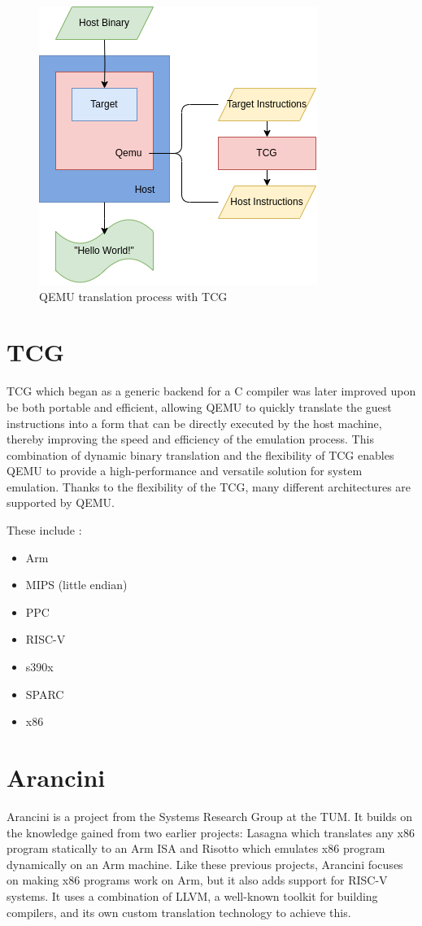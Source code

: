 \begin{figure}[ht]
    \centering
    \includegraphics[width=0.6\linewidth]{figures/qemu_TCG2}
    \caption[QEMU translation process]{\ac{QEMU} translation process with \ac{TCG}}
    \label{fig:qemu_tcg}
\end{figure}

\section{TCG}
\ac{TCG} \cite{qemu_tcg} which began as a generic backend for a C compiler was later improved upon be both portable and efficient, allowing \ac{QEMU} to quickly translate the guest instructions into a form that can be directly executed by the host machine, thereby improving the speed and efficiency of the emulation process.
This combination of dynamic binary translation and the flexibility of \ac{TCG} enables \ac{QEMU} to provide a high-performance and versatile solution for system emulation.
Thanks to the flexibility of the \ac{TCG}, many different architectures are supported by \ac{QEMU}.

These include \cite{qemu_arch}:
\begin{itemize}
    \item Arm
    \item MIPS (little endian)
	\item PPC
	\item RISC-V
	\item s390x
	\item SPARC
	\item x86
\end{itemize}

\section{Arancini}
Arancini is a project from the Systems Research Group at the \ac{TUM}.
It builds on the knowledge gained from two earlier projects: Lasagna \cite{rocha2022lasagne} which translates any x86 program statically to an Arm ISA and Risotto \cite{gouicem2022risotto} which emulates x86 program dynamically on an Arm machine.
Like these previous projects, Arancini focuses on making x86 programs work on Arm, but it also adds support for RISC-V systems.
It uses a combination of LLVM, a well-known toolkit for building compilers, and its own custom translation technology to achieve this.

